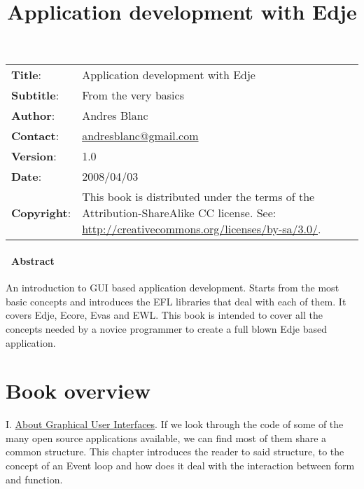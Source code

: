 \documentclass[12pt,a4paper,english]{book}
\title{Application development with Edje}
\author{}
\date{}
\newlength{\docinfowidth}
\newlength{\locallinewidth}
\begin{document}
\maketitle
\begin{center}
\begin{tabularx}{\docinfowidth}{lX}
\textbf{Title}: &
	Application development with Edje \\
\textbf{Subtitle}: &
	From the very basics \\
\textbf{Author}: &
	Andres Blanc \\
\textbf{Contact}: &
	\href{mailto:andresblanc@gmail.com}{andresblanc@gmail.com} \\
\textbf{Version}: &
	1.0 \\
\textbf{Date}: &
	2008/04/03 \\
\textbf{Copyright}: &
	This book is distributed under the terms of the Attribution-ShareAlike
CC license. See: \href{http://creativecommons.org/licenses/by-sa/3.0/}{http://creativecommons.org/licenses/by-sa/3.0/}. \\
\end{tabularx}
\end{center}

\setlength{\locallinewidth}{\linewidth}


\subsubsection*{~\hfill Abstract\hfill ~}

An introduction to GUI based application development. Starts from
the most basic concepts and introduces the EFL libraries that deal
with each of them. It covers Edje, Ecore, Evas and EWL. This book
is intended to cover all the concepts needed by a novice programmer
to create a full blown Edje based application.

\hypertarget{contents}{}
\renewcommand{\contentsname}{Contents}
\tableofcontents

\bigskip
\label{contents}



\hypertarget{book-overview}{}
\chapter{Book overview}
\label{book-overview}

I. \href{\#about-graphical-user-interfaces}{About Graphical User Interfaces}.
If we look through the code of some of the many open source applications
available, we can find most of them share a common structure. This chapter
introduces the reader to said structure, to the concept of an Event loop and
how does it deal with the interaction between form and function.
\end{document}
